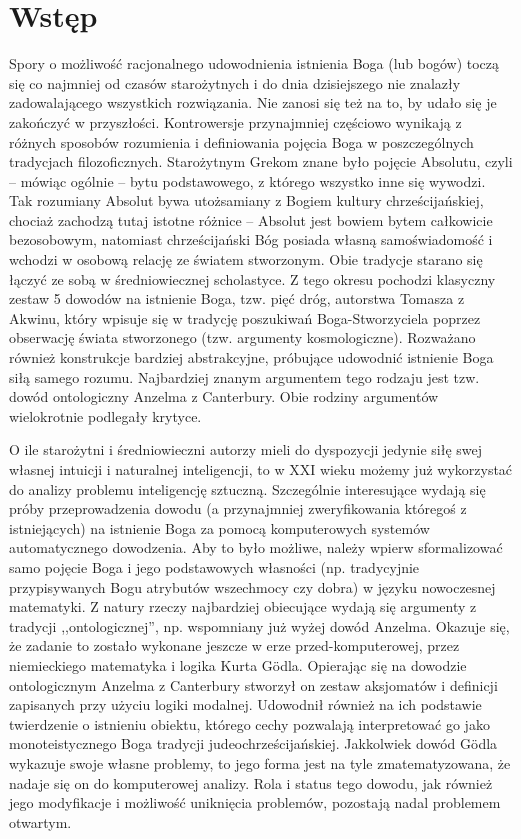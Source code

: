 \documentclass[runningheads]{llncs}
\begin{document}
\section{Wstęp} \label{sec:intro}
Spory o możliwość racjonalnego udowodnienia istnienia Boga (lub bogów) toczą się co najmniej od czasów starożytnych i do dnia dzisiejszego nie znalazły zadowalającego wszystkich rozwiązania. Nie zanosi się też na to, by udało się je zakończyć w przyszłości. Kontrowersje przynajmniej częściowo wynikają z różnych sposobów rozumienia i definiowania pojęcia Boga w poszczególnych tradycjach filozoficznych. Starożytnym Grekom znane było pojęcie Absolutu, czyli -- mówiąc ogólnie -- bytu podstawowego, z którego wszystko inne się wywodzi. Tak rozumiany Absolut bywa utożsamiany z Bogiem kultury chrześcijańskiej, chociaż zachodzą tutaj istotne różnice -- Absolut jest bowiem bytem całkowicie bezosobowym, natomiast chrześcijański Bóg posiada własną samoświadomość i wchodzi w osobową relację ze światem stworzonym. Obie tradycje starano się łączyć ze sobą w średniowiecznej scholastyce. Z tego okresu pochodzi klasyczny zestaw 5 dowodów na istnienie Boga, tzw. pięć dróg, autorstwa Tomasza z Akwinu, który wpisuje się w tradycję poszukiwań Boga-Stworzyciela poprzez obserwację świata stworzonego (tzw. argumenty kosmologiczne). Rozważano również konstrukcje bardziej abstrakcyjne, próbujące udowodnić istnienie Boga siłą samego rozumu. Najbardziej znanym argumentem tego rodzaju jest tzw. dowód ontologiczny Anzelma z Canterbury. Obie rodziny argumentów wielokrotnie podlegały krytyce. 

O ile starożytni i średniowieczni autorzy mieli do dyspozycji jedynie siłę swej własnej intuicji i naturalnej inteligencji, to w XXI wieku możemy już wykorzystać do analizy problemu inteligencję sztuczną. Szczególnie interesujące wydają się próby przeprowadzenia dowodu (a przynajmniej zweryfikowania któregoś z istniejących) na istnienie Boga za pomocą komputerowych systemów automatycznego dowodzenia. Aby to było możliwe, należy wpierw sformalizować samo pojęcie Boga i jego podstawowych własności (np. tradycyjnie przypisywanych Bogu atrybutów wszechmocy czy dobra) w języku nowoczesnej matematyki. Z natury rzeczy najbardziej obiecujące wydają się argumenty z tradycji ,,ontologicznej'', np. wspomniany już wyżej dowód Anzelma. Okazuje się, że zadanie to zostało wykonane jeszcze w erze przed-komputerowej, przez niemieckiego matematyka i logika Kurta G\"odla. Opierając się na dowodzie ontologicznym Anzelma z Canterbury stworzył on zestaw aksjomatów i definicji zapisanych przy użyciu logiki modalnej. Udowodnił również na ich podstawie twierdzenie o istnieniu obiektu, którego cechy pozwalają interpretować go jako monoteistycznego Boga tradycji judeochrześcijańskiej. Jakkolwiek dowód G\"odla wykazuje swoje własne problemy, to jego forma jest na tyle zmatematyzowana, że nadaje się on do komputerowej analizy. Rola i status tego dowodu, jak również jego modyfikacje i możliwość uniknięcia problemów, pozostają nadal problemem otwartym. 
\end{document}
